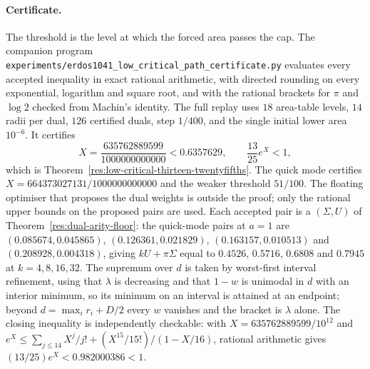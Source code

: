 \documentclass[11pt]{article}
\begin{document}
\paragraph{Certificate.}
The threshold is the level at which the forced area passes the cap.  The
companion program
\texttt{experiments/erdos1041\_low\_critical\_path\_certificate.py} evaluates
every accepted inequality in exact rational arithmetic, with directed rounding
on every exponential, logarithm and square root, and with the rational
brackets for $\pi$ and $\log2$ checked from Machin's identity.  The full
replay uses $18$ area-table levels, $14$ radii per dual, $126$ certified
duals, step $1/400$, and the single initial lower area $10^{-6}$.  It
certifies
\[
 X=\frac{635762889599}{1000000000000}<0.6357629,
 \qquad \frac{13}{25}e^{X}<1,
\]
which is Theorem~\ref{res:low-critical-thirteen-twentyfifths}.  The quick mode
certifies $X=664373027131/1000000000000$ and the weaker threshold $51/100$.
The floating optimiser that proposes the dual weights is outside the proof;
only the rational upper bounds on the proposed pairs are used.  Each accepted
pair is a $(\Sigma,U)$ of Theorem~\ref{res:dual-arity-floor}: the quick-mode
pairs at $a=1$ are
$(0.085674,0.045865)$, $(0.126361,0.021829)$, $(0.163157,0.010513)$ and
$(0.208928,0.004318)$, giving $kU+\pi\Sigma$ equal to
$0.4526$, $0.5716$, $0.6808$ and $0.7945$ at $k=4,8,16,32$.  The supremum over
$d$ is taken by worst-first interval refinement, using that $\lambda$ is
decreasing and that $1-w$ is unimodal in $d$ with an interior minimum, so its
minimum on an interval is attained at an endpoint; beyond
$d=\max_ir_i+D/2$ every $w$ vanishes and the bracket is $\lambda$ alone.
The closing inequality is independently checkable: with
$X=635762889599/10^{12}$ and
$e^X\le\sum_{j\le14}X^j/j!+(X^{15}/15!)/(1-X/16)$, rational arithmetic gives
$(13/25)e^X<0.982000386<1$.
\end{document}
